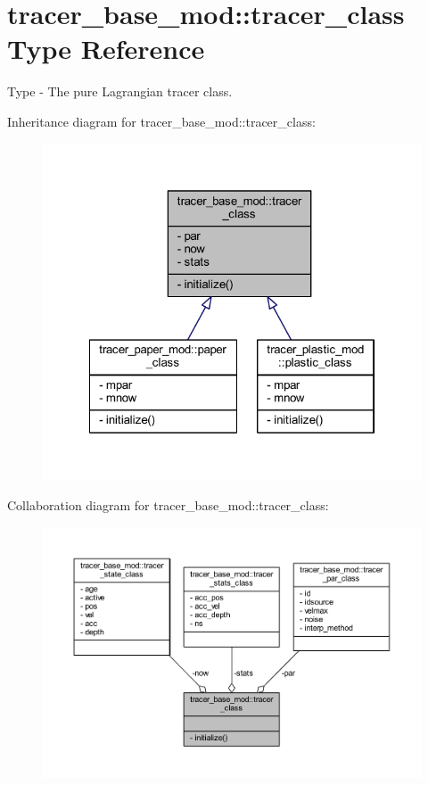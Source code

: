 \hypertarget{structtracer__base__mod_1_1tracer__class}{}\section{tracer\+\_\+base\+\_\+mod\+:\+:tracer\+\_\+class Type Reference}
\label{structtracer__base__mod_1_1tracer__class}


Type -\/ The pure Lagrangian tracer class.  




Inheritance diagram for tracer\+\_\+base\+\_\+mod\+:\+:tracer\+\_\+class\+:\nopagebreak
\begin{figure}[H]
\begin{center}
\leavevmode
\includegraphics[width=322pt]{structtracer__base__mod_1_1tracer__class__inherit__graph}
\end{center}
\end{figure}


Collaboration diagram for tracer\+\_\+base\+\_\+mod\+:\+:tracer\+\_\+class\+:\nopagebreak
\begin{figure}[H]
\begin{center}
\leavevmode
\includegraphics[width=350pt]{structtracer__base__mod_1_1tracer__class__coll__graph}
\end{center}
\end{figure}
